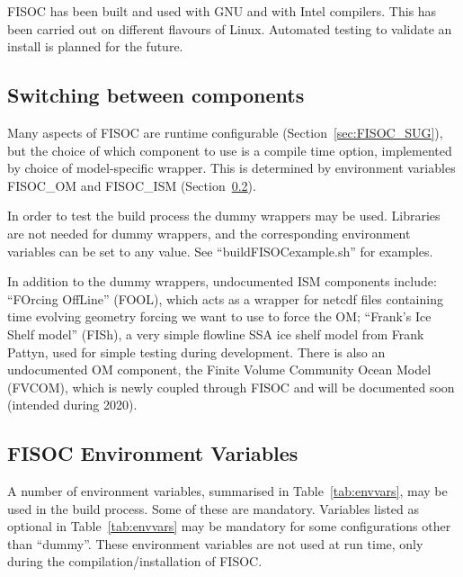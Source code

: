 \documentclass[11pt]{article}
\begin{document}

FISOC has been built and used with GNU and with Intel compilers. 
This has been carried out on different flavours of Linux.
Automated testing to validate an install is planned for the future. 



\subsection{Switching between components}

Many aspects of FISOC are runtime configurable (Section~\ref{sec:FISOC_SUG}), 
but the choice of which component to use is a compile time option, implemented 
by choice of model-specific wrapper. 
This is determined by environment variables FISOC\_OM and FISOC\_ISM 
(Section~\ref{sec:EnvVars}). 

In order to test the build process the dummy wrappers may be used. 
Libraries are not needed for dummy wrappers, and the corresponding 
environment variables can be set to any value.
See  ``buildFISOCexample.sh'' for examples. 

In addition to the dummy wrappers, undocumented ISM components 
 include: 
``FOrcing OffLine'' (FOOL), which acts as a wrapper for netcdf files 
containing time evolving geometry forcing we want to use to force the 
OM; 
``Frank's Ice Shelf model'' (FISh), a very simple flowline SSA 
ice shelf model from Frank Pattyn, used for simple testing during 
development.
There is also an undocumented OM component, the Finite Volume Community Ocean Model (FVCOM), which is newly coupled through
FISOC and will be documented soon (intended during 2020). 



\subsection{FISOC Environment Variables}
\label{sec:EnvVars}

A number of  environment variables, summarised in Table~\ref{tab:envvars},
may be used in the build process.
Some of these are mandatory. 
Variables listed as optional in Table~\ref{tab:envvars}
may be mandatory for some configurations 
other than ``dummy''.
These environment variables are not used at run time, only during 
the compilation/installation of FISOC.
\end{document}

